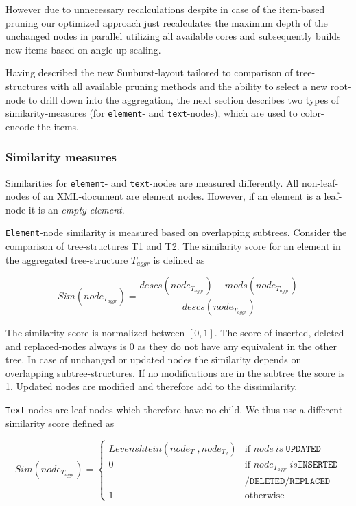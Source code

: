 However due to unnecessary recalculations despite in case of the item-based pruning our optimized approach just recalculates the maximum depth of the unchanged nodes in parallel utilizing all available cores and subsequently builds new items based on angle up-scaling.

Having described the new Sunburst-layout tailored to comparison of tree-structures with all available pruning methods and the ability to select a new root-node to drill down into the aggregation, the next section describes two types of similarity-measures (for \texttt{element}- and \texttt{text}-nodes), which are used to color-encode the items.

\subsubsection{Similarity measures}
Similarities for \texttt{element}- and \texttt{text}-nodes are measured differently. All non-leaf-nodes of an XML-document are element nodes. However, if an element is a leaf-node it is an \emph{empty element}.

\texttt{Element}-node similarity is measured based on overlapping subtrees. Consider the comparison of tree-structures T1 and T2. The similarity score for an element in the aggregated tree-structure $T_{aggr}$ is defined as

\begin{equation}
Sim(node_{T_{aggr}}) = \frac{descs(node_{T_{aggr}}) - mods(node_{T_{aggr}})}{descs(node_{T_{aggr}})}
\end{equation}

The similarity score is normalized between $[0, 1]$. The score of inserted, deleted and replaced-nodes always is 0 as they do not have any equivalent in the other tree. In case of unchanged or updated nodes the similarity depends on overlapping subtree-structures. If no modifications are in the subtree the score is 1. Updated nodes are modified and therefore add to the dissimilarity.

\texttt{Text}-nodes are leaf-nodes which therefore have no child. We thus use a different similarity score defined as

\begin{equation}
Sim(node_{T_{aggr}}) = \left\{ \begin{array}{cl}
Levenshtein(node_{T_{1}}, node_{T_{2}}) & \textrm{if }node\ is\ \texttt{UPDATED}\\
0 & \textrm{if }node_{T_{aggr}}\ is \texttt{INSERTED}\\
  & \texttt{/DELETED/REPLACED}\\
1 & \textrm{otherwise}\end{array}\right.
\end{equation}

